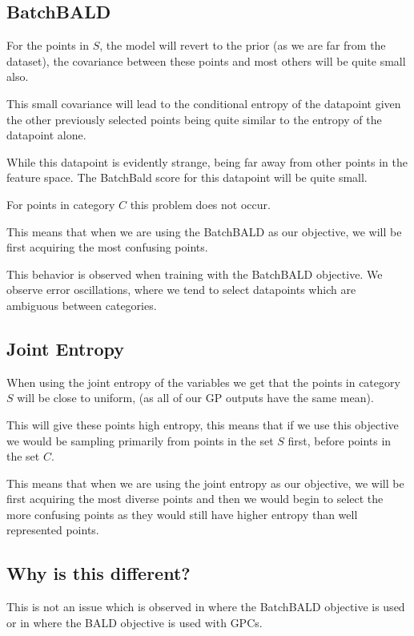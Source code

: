 \documentclass[12pt, a4paper]{report}
\theoremstyle{definition}
\theoremstyle{definition}
\theoremstyle{definition}
\begin{document}
\subsection{BatchBALD}
For the points in $S$, the model will revert to the prior (as we are far from the dataset), the covariance between these points and most others will be quite small also.

This small covariance will lead to the conditional entropy of the datapoint given the other previously selected points being quite similar to the entropy of the datapoint alone.

While this datapoint is evidently strange, being far away from other points in the feature space. The BatchBald score for this datapoint will be quite small.

For points in category $C$ this problem does not occur.

This means that when we are using the BatchBALD as our objective, we will be first acquiring the most confusing points.


This behavior is observed when training with the BatchBALD objective. We observe error oscillations, where we tend to select datapoints which are ambiguous between categories.

\subsection{Joint Entropy}
When using the joint entropy of the variables we get that the points in category $S$ will be close to uniform, (as all of our GP outputs have the same mean).

This will give these points high entropy, this means that if we use this objective we would be sampling primarily from points in the set $S$ first, before points in the set $C$.

This means that when we are using the joint entropy as our objective, we will be first acquiring the most diverse points and then we would begin to select the more confusing points as they would still have higher entropy than well represented points.


\subsection{Why is this different?}

This is not an issue which is observed in \cite{kirsch2019batchbald} where the BatchBALD objective is used or in \cite{houlsby2011bayesian} where the BALD objective is used with GPCs. 
\end{document}

